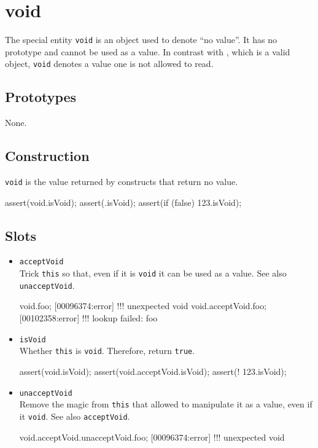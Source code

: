 \section{void}

The special entity \lstinline|void| is an object used to denote ``no
value''.  It has no prototype and cannot be used as a value.  In
contrast with , which is a valid object,
\lstinline|void| denotes a value one is not allowed to read.

\subsection{Prototypes}

None.

\subsection{Construction}

\lstinline|void| is the value returned by constructs that return no
value.

\begin{urbiscript}
assert(void.isVoid);
assert({}.isVoid);
assert({if (false) 123}.isVoid);
\end{urbiscript}

\subsection{Slots}

\begin{itemize}
\item \lstinline|acceptVoid|\\
  Trick \lstinline|this| so that, even if it is \lstinline|void| it
  can be used as a value.  See also \lstinline|unacceptVoid|.
\begin{urbiscript}[firstnumber=last]
void.foo;
[00096374:error] !!! unexpected void
void.acceptVoid.foo;
[00102358:error] !!! lookup failed: foo
\end{urbiscript}

\item \lstinline|isVoid|\\
  Whether \lstinline|this| is \lstinline|void|.  Therefore, return
  \lstinline|true|.
\begin{urbiscript}[firstnumber=last]
assert(void.isVoid);
assert(void.acceptVoid.isVoid);
assert(! 123.isVoid);
\end{urbiscript}

\item \lstinline|unacceptVoid|\\
  Remove the magic from \lstinline|this| that allowed to manipulate it
  as a value, even if it \lstinline|void|.  See also
  \lstinline|acceptVoid|.
\begin{urbiscript}[firstnumber=last]
void.acceptVoid.unacceptVoid.foo;
[00096374:error] !!! unexpected void
\end{urbiscript}

\end{itemize}




